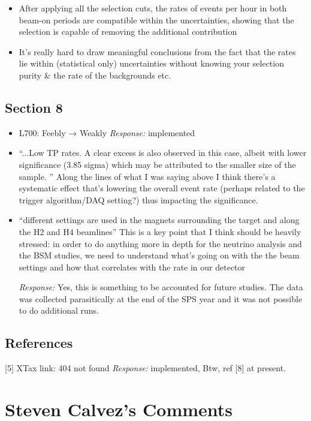 \documentclass[11pt]{article}
\begin{document}
\begin{itemize}
\begin{enumerate}
    \end{enumerate}
    \item After applying all the selection cuts, the rates of events per hour in both beam-on periods are compatible within the uncertainties, showing that the selection is capable of removing the additional contribution
    \item It’s really hard to draw meaningful conclusions from the fact that the rates lie within (statistical only) uncertainties without knowing your selection purity \& the rate of the backgrounds etc.
\end{itemize}

\subsection*{Section 8}
\begin{itemize}
    \item L700: Feebly → Weakly
    \textit{Response:} implemented
    
    \item “...Low TP rates. A clear excess is also observed in this case, albeit with lower significance (3.85 sigma) which may be attributed to the smaller size of the sample. ” Along the lines of what I was saying above I think there’s a systematic effect that’s lowering the overall event rate (perhaps related to the trigger algorithm/DAQ setting?) thus impacting the significance.
    
    \item “different settings are used in the magnets surrounding the target and along the H2 and H4 beamlines” This is a key point that I think should be heavily stressed: in order to do anything more in depth for the neutrino analysis and the BSM studies, we need to understand what’s going on with the the beam settings and how that correlates with the rate in our detector
    
    \textit{Response: } Yes, this is something to be accounted for future studies. The data was collected parasitically at the end of the SPS year and it was not possible to do additional runs. 
\end{itemize}

\subsection*{References}
[5] XTax link: 404 not found  \textit{Response:} implemented, Btw, ref [8] at present.


\section*{Steven Calvez's Comments}
\end{document}
